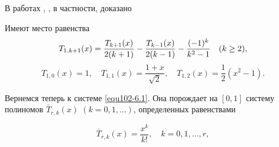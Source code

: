 В работах \cite{Shar20}, \cite{Shar25}, в частности, доказано
\begin{corollary} Имеют место равенства
\begin{equation}\label{equ102-6.8}
T_{1,k+1}(x)={T_{k+1}(x)\over2(k+1)}- {T_{k-1}(x)\over2(k-1)} -\frac{(-1)^k}{k^2-1}\quad (k\ge 2),
\end{equation}
\begin{equation}\label{equ102-6.9}
T_{1,0}(x)=1, \quad T_{1,1}(x)=\frac{1+x}{\sqrt{2}}, \quad T_{1,2}(x)=\frac12(x^2-1).
\end{equation}
\end{corollary}
 Вернемся теперь к системе \eqref{equ102-6.1}. Она порождает на $[0,1]$ систему полиномов $\bar T_{r,k}(x)$ $(k=0,1,\ldots)$, определенных равенствами

  \begin{equation}\label{equ102-6.10}
\bar T_{r,k}(x) =\frac{x^k}{k!}, \quad k=0,1,\ldots, r,
\end{equation}

